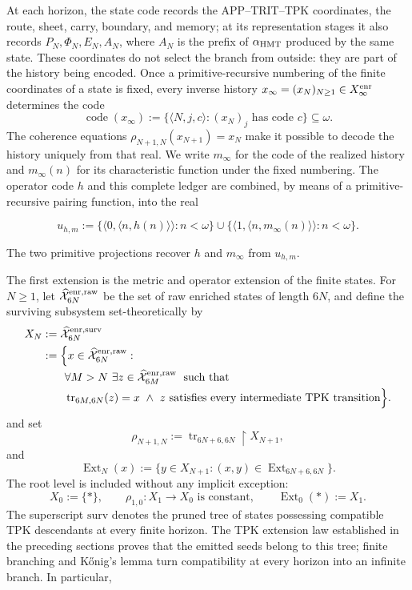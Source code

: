 At each horizon, the state code records the APP--TRIT--TPK coordinates, the
route, sheet, carry, boundary, and memory; at its representation stages it also
records \(P_N,\Phi_N,E_N,A_N\), where \(A_N\) is the prefix of
\(\alpha_{\rm HMT}\) produced by the same state. These coordinates do not
select the branch from outside: they are part of the history being encoded.
Once a primitive-recursive numbering of the finite coordinates of a state is
fixed, every inverse history
\(x_\infty=(x_N)_{N\geq1}\in X_\infty^{\rm enr}\) determines the code
\[
 \operatorname{code}(x_\infty)
 :=\{\langle N,j,c\rangle:(x_N)_j\text{ has code }c\}\subseteq\omega.
\]
The coherence equations
\(\rho_{N+1,N}(x_{N+1})=x_N\) make it possible to decode the history uniquely
from that real. We write \(m_\infty\) for the code of the realized history and
\(m_\infty(n)\) for its characteristic function under the fixed numbering.
The operator code \(h\) and this complete ledger are combined, by means of a
primitive-recursive pairing function, into the real

\[
 u_{h,m}:=
 \{\langle0,\langle n,h(n)\rangle\rangle:n<\omega\}
 \cup
 \{\langle1,\langle n,m_\infty(n)\rangle\rangle:n<\omega\}.
\tag{C.33a}\label{eq:ch-codigo-conjunto}
\]

The two primitive projections recover \(h\) and \(m_\infty\) from
\(u_{h,m}\).

The first extension is the metric and operator extension of the finite states.
For \(N\ge1\), let \(\widehat{\mathcal X}^{\rm enr,raw}_{6N}\) be the set of
raw enriched states of length \(6N\), and define the surviving subsystem
set-theoretically by
\[
\begin{aligned}
 X_N
 &:=\widehat{\mathcal X}^{\rm enr,surv}_{6N}\\
 &:=\Bigl\{x\in\widehat{\mathcal X}^{\rm enr,raw}_{6N}:\\[-.2ex]
 &\qquad\forall M>N\ \exists z\in
   \widehat{\mathcal X}^{\rm enr,raw}_{6M}\;\text{ such that}\\[-.2ex]
 &\qquad\operatorname{tr}_{6M,6N}(z)=x\ \wedge\
   z\text{ satisfies every intermediate TPK transition}\Bigr\}.
\end{aligned}
\]
and set
\[
 \rho_{N+1,N}:=\operatorname{tr}_{6N+6,6N}\!\upharpoonright X_{N+1},
\]
and
\[
 \operatorname{Ext}_N(x):=
 \{y\in X_{N+1}:(x,y)\in
 \operatorname{Ext}_{6N+6,6N}\}.
\]
The root level is included without any implicit exception:
\[
 X_0:=\{\ast\},\qquad
 \rho_{1,0}:X_1\to X_0\text{ is constant},\qquad
 \operatorname{Ext}_0(\ast):=X_1.
\]
The superscript \(\mathrm{surv}\) denotes the pruned tree of states possessing
compatible TPK descendants at every finite horizon. The TPK extension law
established in the preceding sections proves that the emitted seeds belong to
this tree; finite branching and Kőnig's lemma turn compatibility at every
horizon into an infinite branch. In particular,

